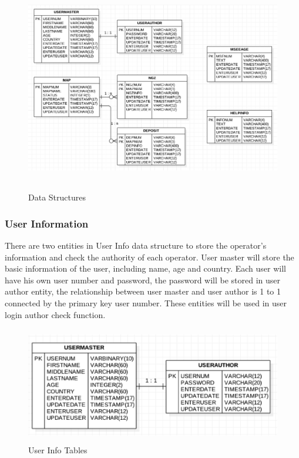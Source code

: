 \documentclass[11pt, a4paper]{article}
\begin{document}
\begin{figure}[H]
\centering
\includegraphics[height=3.6in]{DS}
\caption[Data Structures]{Data Structures}
\end{figure}

\subsubsection{User Information}
There are two entities in User Info data structure to store the operator's information and check the authority of each operator. User master will store the basic information of the user, including name, age and country. Each user will have his own user number and password, the password will be stored in user author entity, the relationship between user master and user author is 1 to 1 connected by the primary key user number. These entities will be used in user login author check function.

\begin{figure}[H]
\centering
\includegraphics[height=2in]{UI}
\caption[User Info Tables]{User Info Tables}
\end{figure}
\end{document}
